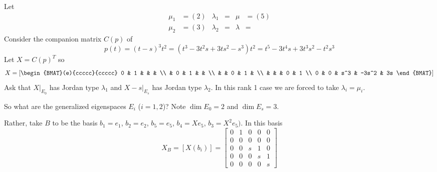\begin{example}
    Let 
    \[
    \begin{aligned}
        \mu_1 &= (2) & \lambda_1 &= & \mu &= (5) \\
        \mu_2 &= (3) & \lambda_2 &= & \lambda &= 
    \end{aligned}
    \]
    Consider the companion matrix $C(p)$ of 
    $$p(t) = (t-s)^3t^2 = (t^3 - 3t^2 s + 3t s^2 - s^3)t^2 = t^5 - 3 t^4 s + 3t^3 s^2 - t^2 s^3$$ 
    Let $X = C(p)^T$ so 
    \[
    X = \left[\begin{BMAT}(e){ccccc}{ccccc}
        0 & 1 & & & \\ 
        & 0 & 1 & & \\
        &   & 0 & 1 & \\ 
        &   &   & 0 & 1 \\
       0 & 0 & s^3 & -3s^2  & 3s  
    \end{BMAT}\right]    
    \]
    Ask that $X\big|_{E_0}$ has Jordan type $\lambda_1$ and $X-s\big|_{E_s}$ has Jordan type $\lambda_2$. In this rank 1 case we are forced to take $\lambda_i = \mu_i$. 
    
    So what are the generalized eigenspaces $E_i$ ($i = 1,2$)? Note $\dim E_0 = 2$ and $\dim E_s = 3$. 
    

    Rather, take $B$ to be the basis $b_1 = e_1$, $b_2 = e_2$, $b_5 = e_5$, $b_4 = Xe_5$, $b_3 = X^2e_5)$. In this basis
    \[
    X_B = [X(b_i)] = \begin{bmatrix}
        0 & 1 & 0 & 0 & 0 \\
        0 & 0 & 0 & 0 & 0 \\
        0 & 0 & s & 1 & 0 \\
        0 & 0 & 0 & s & 1 \\
        0 & 0 & 0 & 0 & s
    \end{bmatrix}
    \]

\end{example}

